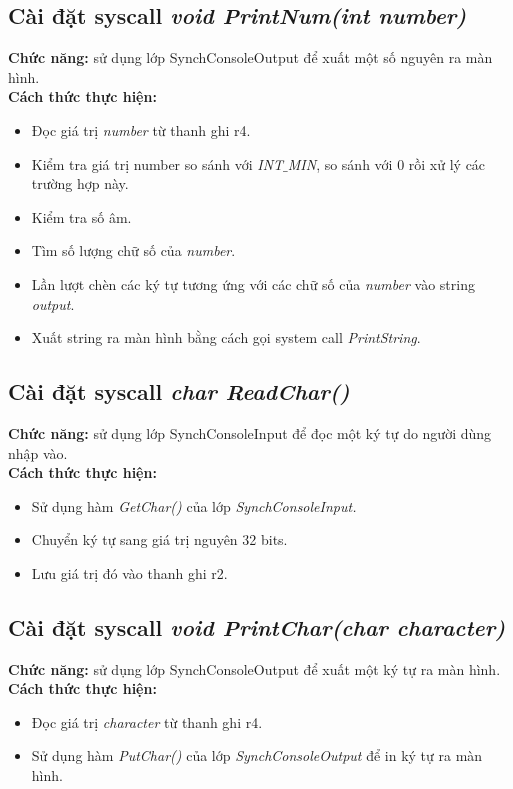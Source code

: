 \subsection{Cài đặt syscall \textit{void PrintNum(int number)}}
\textbf{Chức năng:} sử dụng lớp SynchConsoleOutput để xuất một số nguyên ra màn hình.\\
\textbf{Cách thức thực hiện:}
\begin{itemize}
\item Đọc giá trị \textit{number} từ thanh ghi r4.
\item Kiểm tra giá trị number so sánh với \textit{INT$\_$MIN}, so sánh với 0 rồi xử lý các trường hợp này.
\item Kiểm tra số âm.
\item Tìm số lượng chữ số của \textit{number}.
\item Lần lượt chèn các ký tự tương ứng với các chữ số của \textit{number} vào string \textit{output}.
\item Xuất string ra màn hình bằng cách gọi system call \textit{PrintString}.
\end{itemize}

\subsection{Cài đặt syscall \textit{char ReadChar()}}
\textbf{Chức năng:} sử dụng lớp SynchConsoleInput để đọc một ký tự do người dùng nhập vào.\\
\textbf{Cách thức thực hiện:}
\begin{itemize}
\item Sử dụng hàm \textit{GetChar()} của lớp \textit{SynchConsoleInput.}
\item Chuyển ký tự sang giá trị nguyên 32 bits.
\item Lưu giá trị đó vào thanh ghi r2.
\end{itemize}

\subsection{Cài đặt syscall \textit{void PrintChar(char character)}}
\textbf{Chức năng:} sử dụng lớp SynchConsoleOutput để xuất một ký tự ra màn hình.\\
\textbf{Cách thức thực hiện:}
\begin{itemize}
\item Đọc giá trị \textit{character} từ thanh ghi r4.
\item Sử dụng hàm \textit{PutChar()} của lớp \textit{SynchConsoleOutput} để in ký tự ra màn hình.
\end{itemize}

